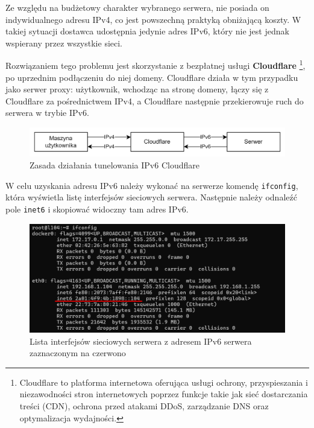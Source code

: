 \documentclass{article}
\begin{document}
Ze względu na budżetowy charakter wybranego serwera, nie posiada on indywidualnego adresu IPv4, co jest powszechną praktyką obniżającą koszty. W takiej sytuacji dostawca udostępnia jedynie adres IPv6, który nie jest jednak wspierany przez wszystkie sieci.

Rozwiązaniem tego problemu jest skorzystanie z bezpłatnej usługi \textbf{Cloudflare} \footnote{Cloudflare to platforma internetowa oferująca usługi ochrony, przyspieszania i niezawodności stron internetowych poprzez funkcje takie jak sieć dostarczania treści (CDN), ochrona przed atakami DDoS, zarządzanie DNS oraz optymalizacja wydajności.}, po uprzednim podłączeniu do niej domeny. Cloudflare działa w tym przypadku jako serwer proxy: użytkownik, wchodząc na stronę domeny, łączy się z Cloudflare za pośrednictwem IPv4, a Cloudflare następnie przekierowuje ruch do serwera w trybie IPv6.

\begin{figure}[H]
    \centering
    \includegraphics[width=1\linewidth]{ipv6diagram.png}
    \caption{Zasada działania tunelowania IPv6 Cloudflare}
    \label{fig:enter-label}
\end{figure}

W celu uzyskania adresu IPv6 należy wykonać na serwerze komendę \lstinline|ifconfig|, która wyświetla listę interfejsów sieciowych serwera. Następnie należy odnaleźć pole \lstinline|inet6| i skopiować widoczny tam adres IPv6.

\begin{figure}[H]
    \centering
    \includegraphics[width=1\linewidth]{ipv6server.png}
    \caption{Lista interfejsów sieciowych serwera z adresem IPv6 serwera zaznaczonym na czerwono}
    \label{fig:enter-label}
\end{figure}
\end{document}
